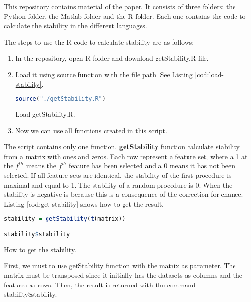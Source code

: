 This repository contains material of the paper. It consists of three folders: the Python folder, the Matlab folder and the R folder. Each one contains the code to calculate the stability in the different languages.

The steps to use the R code to calculate stability are as follows:

\begin{enumerate}
    \item In the repository, open R folder and download getStability.R file.
    
    \item Load it using source function with the file path. See Listing \ref{cod:load-stability}.
    
\begin{codefloat}[H]
\begin{lstlisting}[language=R, style=Ccolor]
source("./getStability.R")
\end{lstlisting}
\caption{Load getStability.R.}
\label{cod:load-stability}
\end{codefloat}

    \item Now we can use all functions created in this script.
\end{enumerate}

The script contains only one function. \textbf{getStability} function calculate stability from a matrix with ones and zeros. Each row represent a feature set, where a 1 at the $f^{th}$ means the $f^{th}$ feature has been selected and a 0 means it has not been selected. If all feature sets are identical, the stability of the first procedure is maximal and equal to 1. The stability of a random procedure is 0. When the stability is negative is because this is a consequence of the correction for chance. Listing \ref{cod:get-stability} shows how to get the result.

\begin{codefloat}[H]
\begin{lstlisting}[language=R, style=Ccolor]
stability = getStability(t(matrix))

stability$stability
\end{lstlisting}
\caption{How to get the stability.}
\label{cod:get-stability}
\end{codefloat}

First, we must to use getStability function with the matrix as parameter. The matrix must be transposed since it initially has the datasets as columns and the features as rows. Then, the result is returned with the command stability\$stability.

